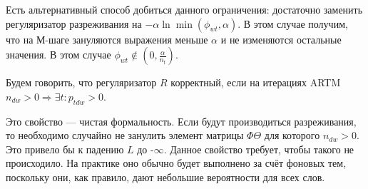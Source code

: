 \documentclass[12pt, twoside]{article}
\begin{document}
Есть альтернативный способ добиться данного ограничения: достаточно заменить регуляризатор разреживания на $-\alpha \ln \min(\phi_{wt}, \alpha)$. В этом случае получим, что на М-шаге зануляются выражения меньше $\alpha$ и не изменяются остальные значения. В этом случае $\phi_{wt}\notin (0, \frac{\alpha}{n_t})$.

\begin{Definition}
\label{fairreg}
Будем говорить, что регуляризатор $R$ корректный, если на итерациях ARTM $n_{dw} > 0 \Rightarrow \exists t\colon p_{tdw} > 0$.
\end{Definition}

Это свойство --- чистая формальность. Если будут производиться разреживания, то необходимо случайно не занулить элемент матрицы $\Phi \Theta$ для которого $n_{dw} > 0$. Это привело бы к падению $L$ до -$\infty$.  Данное свойство требует, чтобы такого не происходило. На практике оно обычно будет выполнено за счёт фоновых тем\cite{artmdef2}, поскольку они, как правило, дают небольшие вероятности для всех слов.
\end{document}
